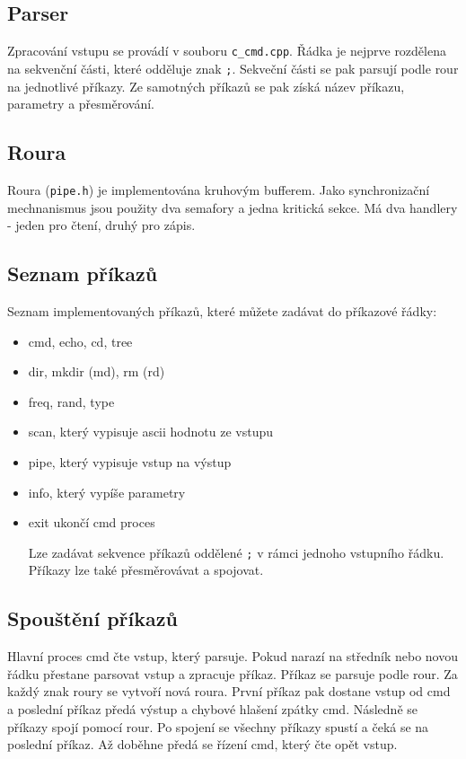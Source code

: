 \documentclass[a4paper]{article}
\begin{document}
\subsection{Parser}
Zpracování vstupu se provádí v souboru \verb+c_cmd.cpp+.
Řádka je nejprve rozdělena na sekvenční části, které odděluje znak \verb+;+. Sekveční části se pak parsují podle rour na jednotlivé příkazy. Ze samotných příkazů se pak získá název příkazu, parametry a přesměrování.



\subsection{Roura}
Roura (\verb+pipe.h+) je implementována kruhovým bufferem. Jako synchronizační mechnanismus jsou použity dva semafory a jedna kritická sekce. Má dva handlery - jeden pro čtení, druhý pro zápis.

\subsection{Seznam příkazů}
Seznam implementovaných příkazů, které můžete zadávat do příkazové řádky:
\label{cmd}
\begin{itemize}
\item cmd, echo, cd, tree
\item dir, mkdir (md), rm (rd)
\item freq, rand, type
\item scan, který vypisuje ascii hodnotu ze vstupu
\item pipe, který vypisuje vstup na výstup
\item info, který vypíše parametry
\item exit ukončí cmd proces

Lze zadávat sekvence příkazů oddělené \verb+;+ v rámci jednoho vstupního řádku. Příkazy lze také přesměrovávat a spojovat.
\end{itemize}

\subsection{Spouštění příkazů}

Hlavní proces cmd čte vstup, který parsuje. Pokud narazí na středník nebo novou řádku přestane parsovat vstup a zpracuje příkaz. Příkaz se parsuje podle rour. Za každý znak roury se vytvoří nová roura. První příkaz pak dostane vstup od cmd a poslední příkaz předá výstup a chybové hlašení zpátky cmd. Následně se příkazy spojí pomocí rour. Po spojení se všechny příkazy spustí a čeká se na poslední příkaz. Až doběhne předá se řízení cmd, který čte opět vstup.
\end{document}
